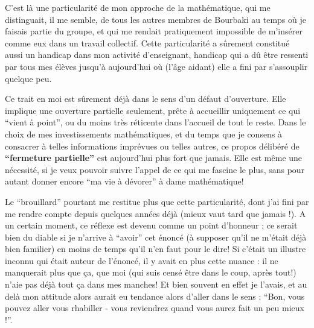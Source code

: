 C'est là une particularité de mon approche de la mathématique, qui me distinguait, il me semble, de tous les autres membres de Bourbaki au temps où je faisais partie du groupe, et qui me rendait pratiquement impossible de m'insérer comme eux dans un travail collectif. Cette particularité a sûrement constitué aussi un handicap dans mon activité d'enseignant, handicap qui a dû être ressenti par tous mes élèves jusqu'à aujourd'hui où (l'âge aidant) elle a fini par s'assouplir quelque peu.

Ce trait en moi est sûrement déjà dans le sens d'un défaut d'ouverture. Elle implique une ouverture partielle seulement, prête à accueillir uniquement ce qui ``vient à point'', ou du moins très réticente dans l'accueil de tout le reste. Dans le choix de mes investissements mathématiques, et du temps que je consens à consacrer à telles informations imprévues ou telles autres, ce propos délibéré de \textbf{``fermeture partielle''} est aujourd'hui plus fort que jamais. Elle est même une nécessité, si je veux pouvoir suivre l'appel de ce qui me fascine le plus, sans pour autant donner encore ``ma vie à dévorer'' à dame mathématique!

Le ``brouillard'' pourtant me restitue plus que cette particularité, dont j'ai fini par me rendre compte depuis quelques années déjà (mieux vaut tard que jamais !). A un certain moment, ce réflexe est devenu comme un point d'honneur ; ce serait bien du diable si je n'arrive à ``avoir'' cet énoncé (à supposer qu'il ne m'était déjà bien familier) en moins de temps qu'il n'en faut pour le dire! Si c'était un illustre inconnu qui était auteur de l'énoncé, il y avait en plus cette nuance : il ne manquerait plus que ça, que moi (qui suis censé être dans le coup, après tout!) n'aie pas déjà tout ça dans mes manches! Et bien souvent en effet je l'avais, et au delà mon attitude alors aurait eu tendance alors d'aller dans le sens : ``Bon, vous pouvez aller vous rhabiller - vous reviendrez quand vous aurez fait un peu mieux !''.

